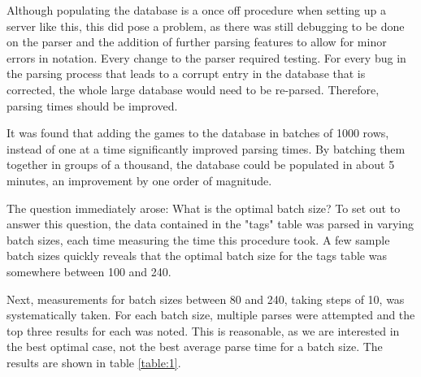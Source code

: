 \documentclass{article}
\begin{document}
Although populating the database is a once
off procedure when setting up a server like this, this did pose a problem,
as there was still debugging to be done on the parser and the addition of
further parsing features to allow for minor errors in notation. Every change to
the parser required testing.  For every bug in the parsing process that leads
to a corrupt entry in the database that is corrected, the whole large database
would need to be re-parsed.  Therefore, parsing times should be improved.

It was found that adding the games to the database in batches of 1000 rows,
instead of one at a time significantly improved parsing times. By batching them
together in groups of a thousand, the database could be populated in about 5
minutes, an improvement by one order of magnitude.

The question immediately arose:  What is the optimal batch size? To set out
to answer this question, the data contained in the "tags" table was parsed in
varying batch sizes, each time measuring the time this procedure took.  A
few sample batch sizes quickly reveals that the optimal batch size for the
tags table was somewhere between 100 and 240.

Next, measurements for batch sizes between 80 and
240, taking steps of 10, was systematically taken.  For each batch size,
multiple parses were attempted and the top three results for each was noted.
This is reasonable, as we are interested in the best optimal case, not the best
average parse time for a batch size.  The results are shown in table
\ref{table:1}.
\end{document}
